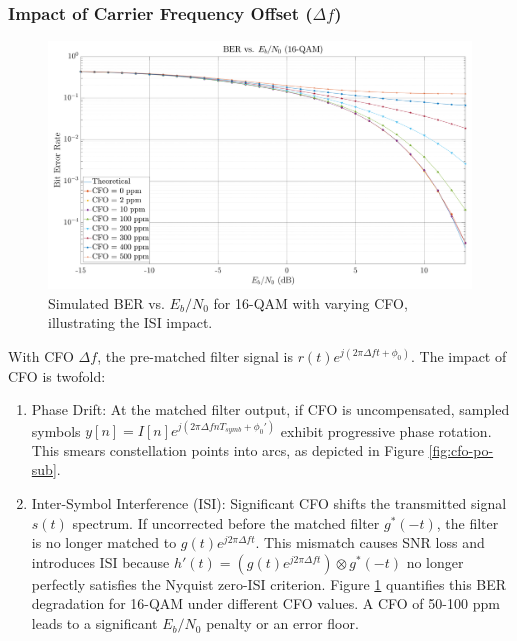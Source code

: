 \documentclass[11pt]{article}
\begin{document}
	\subsubsection{Impact of Carrier Frequency Offset ($\Delta f$)}
	\begin{figure}[H]
		\centering
		\includegraphics[width=0.8\linewidth]{Images/ber-cfo}
		\caption{Simulated BER vs. $E_b/N_0$ for 16-QAM with varying CFO, illustrating the ISI impact.}
		\label{fig:ber-cfo}
	\end{figure}
	With CFO $\Delta f$, the pre-matched filter signal is $r(t)e^{j(2\pi \Delta f t + \phi_0)}$. The impact of CFO is twofold:
	\begin{enumerate}
		\item Phase Drift: At the matched filter output, if CFO is uncompensated, sampled symbols $y[n] = I[n]e^{j(2\pi \Delta f nT_{symb} + \phi_0')}$ exhibit progressive phase rotation. This smears constellation points into arcs, as depicted in Figure \ref{fig:cfo-po-sub}.
		\item Inter-Symbol Interference (ISI): Significant CFO shifts the transmitted signal $s(t)$ spectrum. If uncorrected before the matched filter $g^*(-t)$, the filter is no longer matched to $g(t)e^{j2\pi \Delta f t}$. This mismatch causes SNR loss and introduces ISI because $h'(t) = (g(t)e^{j2\pi \Delta f t}) \otimes g^*(-t)$ no longer perfectly satisfies the Nyquist zero-ISI criterion. Figure \ref{fig:ber-cfo} quantifies this BER degradation for 16-QAM under different CFO values. A CFO of 50-100 ppm leads to a significant $E_b/N_0$ penalty or an error floor.
	\end{enumerate}
	
\end{document}
